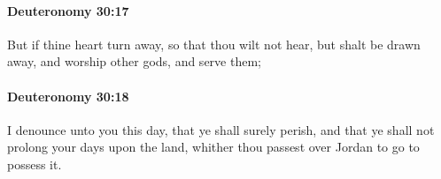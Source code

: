 		\paragraph{Deuteronomy 30:17} %
			\label{DEUTERONOMY-30-17}

			But if thine heart turn away, so that thou wilt not hear, but shalt be drawn away, and worship other gods, and serve them;


		\paragraph{Deuteronomy 30:18} %
			\label{DEUTERONOMY-30-18}

			I denounce unto you this day, that ye shall surely perish, and that ye shall not prolong your days upon the land, whither thou passest over Jordan to go to possess it.


